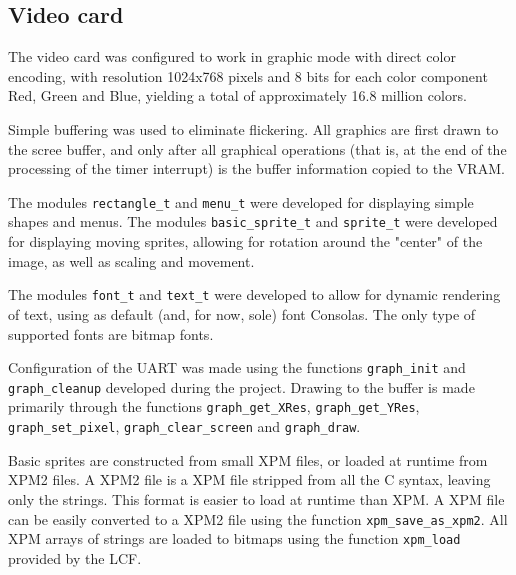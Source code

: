 \documentclass{article}
\theoremstyle{remark}
\begin{document}
\subsection{Video card}
The video card was configured to work in graphic mode with direct color encoding, with resolution 1024x768 pixels and 8 bits for each color component Red, Green and Blue, yielding a total of approximately 16.8 million colors. \par
Simple buffering was used to eliminate flickering. All graphics are first drawn to the scree buffer, and only after all graphical operations (that is, at the end of the processing of the timer interrupt) is the buffer information copied to the VRAM. \par
The modules \texttt{rectangle\_t} and \texttt{menu\_t} were developed for displaying simple shapes and menus. The modules \texttt{basic\_sprite\_t} and \texttt{sprite\_t} were developed for displaying moving sprites, allowing for rotation around the "center" of the image, as well as scaling and movement. \par
The modules \texttt{font\_t} and \texttt{text\_t} were developed to allow for dynamic rendering of text, using as default (and, for now, sole) font Consolas. The only type of supported fonts are bitmap fonts. \par
Configuration of the UART was made using the functions \texttt{graph\_init} and \texttt{graph\_cleanup} developed during the project. Drawing to the buffer is made primarily through the functions \texttt{graph\_get\_XRes}, \linebreak \texttt{graph\_get\_YRes}, \texttt{graph\_set\_pixel}, \texttt{graph\_clear\_screen} and \texttt{graph\_draw}.\par
Basic sprites are constructed from small XPM files, or loaded at runtime from XPM2 files. A XPM2 file is a XPM file stripped from all the C syntax, leaving only the strings. This format is easier to load at runtime than XPM. A XPM file can be easily converted to a XPM2 file using the function \texttt{xpm\_save\_as\_xpm2}. All XPM arrays of strings are loaded to bitmaps using the function \texttt{xpm\_load} provided by the LCF.
\end{document}
